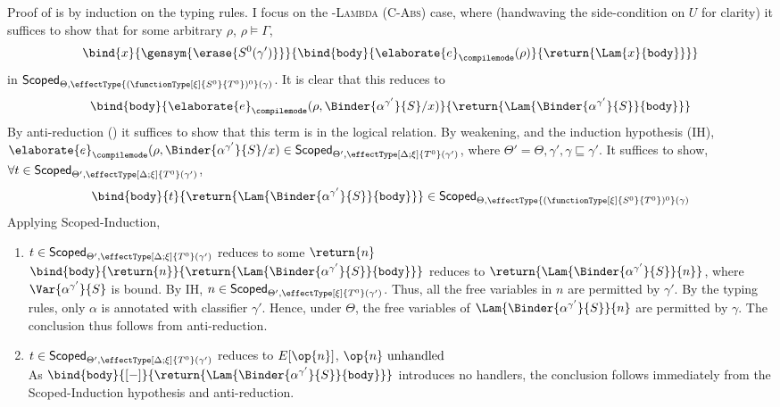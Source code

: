 Proof of  is by induction on the \recLang{} typing rules. I focus on the \textsc{\compilemode{}-Lambda} (\textsc{C-Abs}) case, where (handwaving the side-condition on $U$ for clarity) it suffices to show that for some arbitrary $\rho$, $\rho \vDash \Gamma$, 
\[\bind{x}{\gensym{\erase{S^0 (\gamma')}}}{\bind{\texttt{body}}{\elaborate{e}_{\compilemode}({\rho})}{\return{\Lam{x}{\texttt{body}}}}}\]
in $\scoped{\effectType{(\functionType[\xi]{S^0}{T^0})^0} (\gamma)}$. It is clear that this reduces to
\[{\bind{\texttt{body}}{\elaborate{e}_{\compilemode}({\rho, \Binder{\alpha^{\gamma'}}{S} / x})}{\return{\Lam{\Binder{\alpha^{\gamma'}}{S}}{\texttt{body}}}}}\]
 By anti-reduction () it suffices to show that this term is in the logical relation. By weakening, and the induction hypothesis (IH), $\elaborate{e}_{\compilemode}({\rho, \Binder{\alpha^{\gamma'}}{S} / x}) \in \scoped[\Theta']{\effectType[\Delta; \xi]{T^{0}} (\gamma')}$, where $\Theta' =  \Theta, \gamma', \gamma \sqsubseteq \gamma'$. It suffices to show, $\forall t \in \scoped[\Theta']{\effectType[\Delta; \xi]{T^{0}} (\gamma')}$,
 \[\bind{\texttt{body}}{t}{\return{\Lam{\Binder{\alpha^{\gamma'}}{S}}{\texttt{body}}}} \in \scoped{\effectType{(\functionType[\xi]{S^0}{T^0})^0} (\gamma)}\]  
Applying \textsf{Scoped}-Induction,
 \begin{enumerate}
  \item $t \in \scoped[\Theta']{\effectType[\Delta; \xi]{T^{0}} (\gamma')}$ reduces to some $\return{n}$\\
   $\bind{\texttt{body}}{\return{n}}{\return{\Lam{\Binder{\alpha^{\gamma'}}{S}}{\texttt{body}}}}$ reduces to $\return{\Lam{\Binder{\alpha^{\gamma'}}{S}}{n}}$, where $\Var{\alpha^{\gamma'}}{S}$ is bound. By IH, $n \in \scoped[\Theta']{\effectType[\xi]{T^{0}} (\gamma')}$. Thus, all the free variables in $n$ are permitted by $\gamma'$. By the typing rules, only $\alpha$ is annotated with classifier $\gamma'$. Hence, under $\Theta$, the free variables of $\Lam{\Binder{\alpha^{\gamma'}}{S}}{n}$ are permitted by $\gamma$. The conclusion thus follows from anti-reduction.
  \item $t \in \scoped[\Theta']{\effectType[\Delta; \xi]{T^{0}} (\gamma')}$ reduces to $E[\op{n}]$, $\op{n} \text{ unhandled}$ \\
  As $\bind{\texttt{body}}{[-]}{\return{\Lam{\Binder{\alpha^{\gamma'}}{S}}{\texttt{body}}}}$ introduces no handlers, the conclusion follows immediately from the \textsf{Scoped}-Induction hypothesis and anti-reduction.
\end{enumerate}

